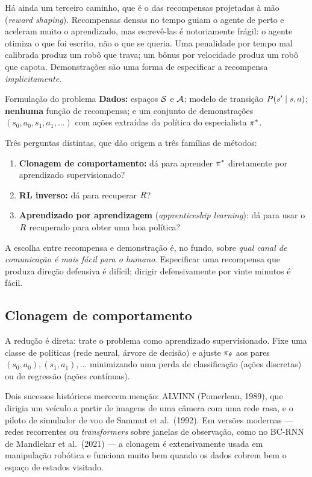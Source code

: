 \documentclass[11pt]{article}
\newcommand{\thv}{\theta}
\newcommand{\polth}{\pol_{\thv}}
\newcommand{\polE}{\pol^{*}}
\begin{document}
Há ainda um terceiro caminho, que é o das recompensas projetadas à mão
(\emph{reward shaping}). Recompensas densas no tempo guiam o agente de perto e aceleram
muito o aprendizado, mas escrevê-las é notoriamente frágil: o agente otimiza o que foi
escrito, não o que se queria. Uma penalidade por tempo mal calibrada produz um robô que
trava; um bônus por velocidade produz um robô que capota. Demonstrações são uma forma de
especificar a recompensa \emph{implicitamente}.

\begin{defbox}{Formulação do problema}
  \textbf{Dados:} espaços $\mathcal{S}$ e $\mathcal{A}$; modelo de transição $P(s'\mid s,a)$;
  \textbf{nenhuma} função de recompensa; e um conjunto de demonstrações
  $(s_0,a_0,s_1,a_1,\dots)$ com ações extraídas da política do especialista $\polE$.

  \smallskip
  Três perguntas distintas, que dão origem a três famílias de métodos:
  \begin{enumerate}
    \item \textbf{Clonagem de comportamento:} dá para aprender $\polE$ diretamente por
      aprendizado supervisionado?
    \item \textbf{RL inverso:} dá para recuperar $R$?
    \item \textbf{Aprendizado por aprendizagem} (\emph{apprenticeship learning}): dá para
      usar o $R$ recuperado para obter uma boa política?
  \end{enumerate}
\end{defbox}

\begin{ideiabox}
  A escolha entre recompensa e demonstração é, no fundo, sobre \emph{qual canal de
  comunicação é mais fácil para o humano}. Especificar uma recompensa que produza direção
  defensiva é difícil; dirigir defensivamente por vinte minutos é fácil.
\end{ideiabox}

\subsection{Clonagem de comportamento}

A redução é direta: trate o problema como aprendizado supervisionado. Fixe uma classe de
políticas (rede neural, árvore de decisão) e ajuste $\polth$ aos pares
$(s_0,a_0), (s_1,a_1), \dots$ minimizando uma perda de classificação (ações discretas) ou
de regressão (ações contínuas).

Dois sucessos históricos merecem menção: ALVINN (Pomerleau, 1989), que dirigia um veículo
a partir de imagens de uma câmera com uma rede rasa, e o piloto de simulador de voo de
Sammut et al.\ (1992). Em versões modernas --- redes recorrentes ou \emph{transformers}
sobre janelas de observação, como no BC-RNN de Mandlekar et al.\ (2021) --- a clonagem é
extensivamente usada em manipulação robótica e funciona muito bem quando os dados cobrem
bem o espaço de estados visitado.
\end{document}
